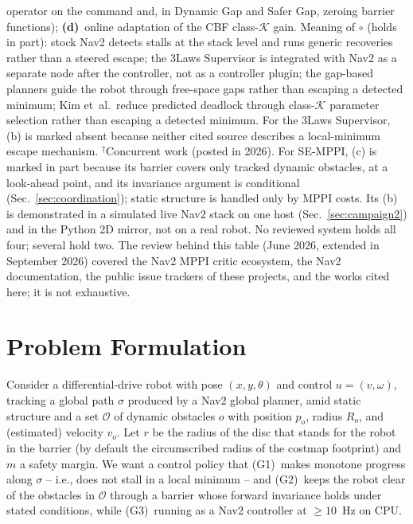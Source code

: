 \documentclass[journal]{IEEEtran}
\newcommand{\pmark}{\ensuremath{\circ}}
\begin{document}
\begin{table}[t]
operator on the command and, in Dynamic Gap and Safer Gap, zeroing barrier
functions);
\textbf{(d)}~online adaptation of the CBF class-$\mathcal{K}$ gain.
Meaning of \pmark{} (holds in part): stock Nav2 detects stalls
at the stack level and runs generic recoveries rather than a steered
escape; the 3Laws Supervisor is integrated with Nav2 as a separate node
after the controller, not as a controller plugin; the gap-based planners
guide the robot through free-space gaps rather than escaping a detected
minimum; Kim et~al.\ reduce predicted
deadlock through class-$\mathcal{K}$ parameter selection rather than
escaping a detected minimum. For the 3Laws Supervisor, (b) is marked
absent because neither cited source describes a local-minimum escape
mechanism. $^{\dagger}$Concurrent work (posted in 2026). For SE-MPPI, (c)
is marked in part because its barrier covers only tracked dynamic
obstacles, at a look-ahead point, and its invariance argument is
conditional (Sec.~\ref{sec:coordination}); static structure is handled
only by MPPI costs. Its (b) is demonstrated in a simulated live Nav2 stack on one host
(Sec.~\ref{sec:campaign2}) and in the Python 2D mirror, not on a real robot. No reviewed system holds all four; several hold
two. The review behind this table (June 2026, extended in September 2026)
covered the Nav2 MPPI critic ecosystem, the Nav2 documentation, the public
issue trackers of these projects, and the works cited here; it is not
exhaustive.

\end{table}

\section{Problem Formulation}
\label{sec:problem}

Consider a differential-drive robot with pose $(x,y,\theta)$ and control
$u=(v,\omega)$, tracking a global path $\sigma$ produced by a Nav2 global
planner, amid static structure and a set $\mathcal{O}$ of dynamic
obstacles $o$ with position $p_o$, radius $R_o$, and (estimated) velocity
$v_o$. Let $r$ be the radius of the disc that stands for the robot in the barrier
(by default the circumscribed radius of the costmap footprint) and $m$ a
safety margin. We
want a control policy that (G1)~makes monotone progress along $\sigma$ --
i.e., does not stall in a local minimum -- and (G2)~keeps the robot
clear of the obstacles in $\mathcal{O}$ through a barrier whose forward
invariance holds under stated conditions, while (G3)~running as a Nav2
controller at $\geq 10$~Hz on CPU.
\end{document}
